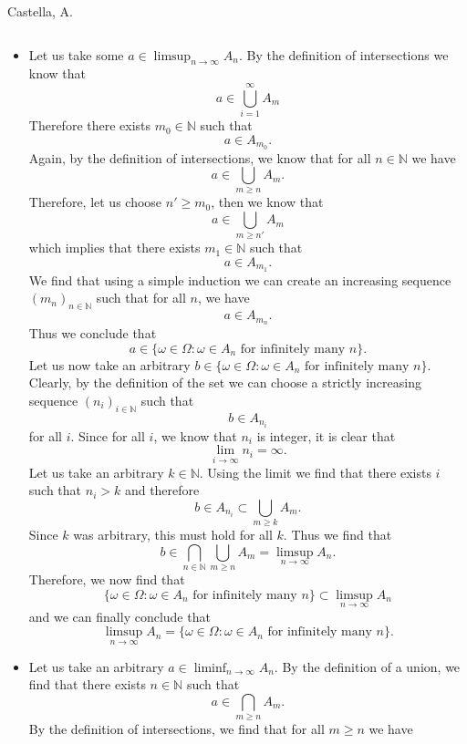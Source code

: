 \begin{solution}[2.3]{Castella, A.}
\begin{itemize}
$$        $$
        \item Let us take some $a \in \limsup_{n\rightarrow\infty}A_n$. By the definition of intersections we know that
        $$
            a \in \bigcup_{i=1}^\infty A_m
        $$
        Therefore there exists $m_0 \in \mathbb{N}$ such that
        $$
            a\in A_{m_0}.
        $$
        Again, by the definition of intersections, we know that for all $n \in \mathbb{N}$ we have
        $$
            a\in \bigcup_{m\geq n}A_m.
        $$
        Therefore, let us choose $n' \geq m_0$, then we know that
        $$
            a\in \bigcup_{m\geq n'}A_m
        $$
        which implies that there exists $m_1 \in \mathbb{N}$ such that
        $$
            a\in A_{m_1}.
        $$
        We find that using a simple induction we can create an increasing sequence $(m_n)_{n\in\mathbb{N}}$ such that for all $n$, we have
        $$
            a\in A_{m_n}.
        $$
        Thus we conclude that
        $$
            a\in \{\omega\in\Omega:\omega\in A_n\text{ for infinitely many }n\}.
        $$
        Let us now take an arbitrary $b \in \{\omega\in\Omega:\omega\in A_n\text{ for infinitely many }n\}$. Clearly, by the definition of the set we can choose a strictly increasing sequence $(n_i)_{i\in\mathbb{N}}$ such that
        $$
            b\in A_{n_i}
        $$
        for all $i$. Since for all $i$, we know that $n_i$ is integer, it is clear that
        $$
            \lim_{i\rightarrow\infty}n_i = \infty.
        $$
        Let us take an arbitrary $k\in\mathbb{N}$. Using the limit we find that there exists $i$ such that $n_i > k$ and therefore
        $$
            b \in A_{n_i} \subset \bigcup_{m\geq k}A_m.
        $$
        Since $k$ was arbitrary, this must hold for all $k$. Thus we find that
        $$
            b \in \bigcap_{n\in\mathbb{N}}\bigcup_{m\geq n}A_m = \limsup_{n\rightarrow\infty}A_n.
        $$
        Therefore, we now find that
        $$
            \{\omega\in\Omega:\omega\in A_n\text{ for infinitely many }n\} \subset \limsup_{n\rightarrow\infty}A_n
        $$
        and we can finally conclude that
        $$
            \limsup_{n\rightarrow\infty}A_n = \{\omega\in\Omega:\omega\in A_n\text{ for infinitely many }n\}.
        $$
        \item Let us take an arbitrary $a \in \liminf_{n\rightarrow\infty}A_n$. By the definition of a union, we find that there exists $n\in\mathbb{N}$ such that
        $$
            a \in \bigcap_{m\geq n}A_m.
        $$
        By the definition of intersections, we find that for all $m\geq n$ we have

\end{itemize}
\end{solution}
